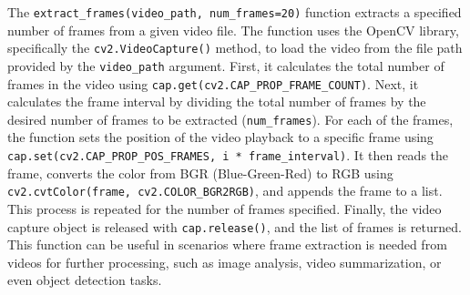 \noindent
The \texttt{extract\_frames(video\_path, num\_frames=20)} function extracts a specified number of frames from a given video file. The function uses the OpenCV library, specifically the \texttt{cv2.VideoCapture()} method, to load the video from the file path provided by the \texttt{video\_path} argument. First, it calculates the total number of frames in the video using \texttt{cap.get(cv2.CAP\_PROP\_FRAME\_COUNT)}. Next, it calculates the frame interval by dividing the total number of frames by the desired number of frames to be extracted (\texttt{num\_frames}). For each of the frames, the function sets the position of the video playback to a specific frame using \texttt{cap.set(cv2.CAP\_PROP\_POS\_FRAMES, i \texttt{*} frame\_interval)}. It then reads the frame, converts the color from BGR (Blue-Green-Red) to RGB using \texttt{cv2.cvtColor(frame, cv2.COLOR\_BGR2RGB)}, and appends the frame to a list. This process is repeated for the number of frames specified. Finally, the video capture object is released with \texttt{cap.release()}, and the list of frames is returned. This function can be useful in scenarios where frame extraction is needed from videos for further processing, such as image analysis, video summarization, or even object detection tasks.


